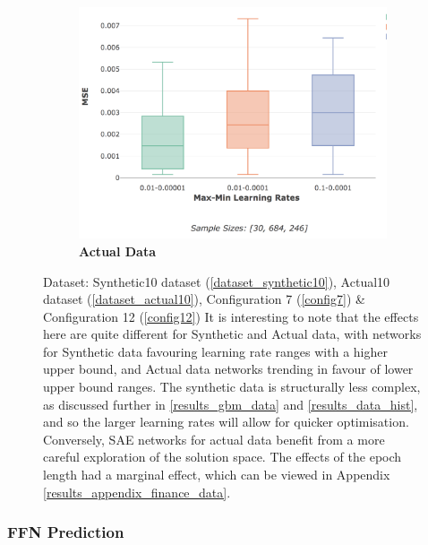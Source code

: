 \documentclass[a4paper,11pt,oneside]{article}
\theoremstyle{plain}
\theoremstyle{definition}
\begin{document}
\begin{figure}[H]
\begin{subfigure}{.5\textwidth}
			\includegraphics[scale=0.3]{images/results/network/lr/actual_mse_minmax_lr.png}
			\caption{\textbf{Actual Data} 
				\newline }
			\label{figure-actual_mse_minmax_lr}
		\end{subfigure}
		\caption[SAE MSE by Learning Rate Schedule Ranges]
		{Dataset: Synthetic10 dataset (\ref{dataset_synthetic10}), Actual10 dataset (\ref{dataset_actual10}), Configuration 7 (\ref{config7}) \& Configuration 12 (\ref{config12})
			\newline It is interesting to  note that the effects here are quite different for Synthetic and Actual data, with networks for Synthetic data favouring learning rate ranges with a higher upper bound, and Actual data networks trending in favour of lower upper bound ranges. The synthetic data is structurally less complex, as discussed further in \ref{results_gbm_data} and \ref{results_data_hist}, and so the larger learning rates will allow for quicker optimisation. Conversely, SAE networks for actual data benefit from a more careful exploration of the solution space. The effects of the epoch length had a marginal effect, which can be viewed in Appendix \ref{results_appendix_finance_data}.}
		\label{figure-mse_lr}
	\end{figure}

	

	

	
	
	
	
	
	
	
	
	\newpage
	\subsubsection{FFN Prediction}
	
\end{document}
